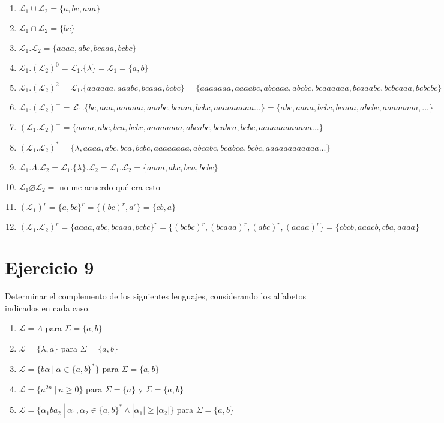 \documentclass{article}
\begin{document}
{{\begin{enumerate}[label=\alph*.,font=\itshape]
    \item {$\mathcal{L}_1 \cup \mathcal{L}_2 = \{a, bc, aaa\}$}
    \item {$\mathcal{L}_1 \cap \mathcal{L}_2 = \{bc\}$}
    \item {$\mathcal{L}_1.\mathcal{L}_2 = \{aaaa, abc, bcaaa, bcbc\}$}
    \item {$\mathcal{L}_1.(\mathcal{L}_2)^0= \mathcal{L}_1 . \{\lambda\} = \mathcal{L}_1 = \{a,b\}$}
    \item {$\mathcal{L}_1 . (\mathcal{L}_2)^2 = \mathcal{L}_1 . \{aaaaaa, aaabc, bcaaa, bcbc\} = \{aaaaaaa, aaaabc, abcaaa, abcbc, bcaaaaaa, bcaaabc, bcbcaaa, bcbcbc\}$}
    \item {$\mathcal{L}_1 . (\mathcal{L}_2)^+ = \mathcal{L}_1 . \{bc,aaa,aaaaaa,aaabc, bcaaa, bcbc, aaaaaaaaa...\}= \{abc, aaaa, bcbc, bcaaa, abcbc, aaaaaaaa, ...\}$}
    \item {$(\mathcal{L}_1.\mathcal{L}_2)^+ = \{aaaa, abc, bca, bcbc, aaaaaaaa, abcabc, bcabca, bcbc, aaaaaaaaaaaa...\}$}
    \item {$(\mathcal{L}_1.\mathcal{L}_2)^* = \{\lambda, aaaa, abc, bca, bcbc, aaaaaaaa, abcabc, bcabca, bcbc, aaaaaaaaaaaa...\}$}
    \item {$\mathcal{L}_1.\Lambda.\mathcal{L}_2 = \mathcal{L}_1.\{\lambda\}.\mathcal{L}_2 = \mathcal{L}_1.\mathcal{L}_2 = \{aaaa, abc, bca, bcbc\}$}
    \item {$\mathcal{L}_1 \varnothing \mathcal{L}_2 =$ no me acuerdo qué era esto}
    \item {$(\mathcal{L}_1)^r = \{a, bc\}^r = \{(bc)^r,a^r\}= \{cb,a\}$}
    \item {$(\mathcal{L}_1.\mathcal{L}_2)^r = \{aaaa, abc, bcaaa, bcbc\}^r = \{(bcbc)^r, (bcaaa)^r, (abc)^r, (aaaa)^r\}=\{cbcb, aaacb, cba, aaaa\}$}
\end{enumerate}

\section*{Ejercicio 9}{Determinar el complemento de los siguientes lenguajes, considerando los alfabetos indicados en cada caso.}
\begin{enumerate}[label=\alph*.,font=\itshape]
    \item {$\mathcal{L} = \Lambda$ para $\Sigma = \{a,b\}$}
    \item {$\mathcal{L} = \{\lambda,a\}$ para $\Sigma = \{a,b\}$}
    \item {$\mathcal{L} = \{b\alpha \ | \ \alpha \in \{a,b\}^*\}$ para $\Sigma = \{a,b\}$}
    \item {$\mathcal{L} = \{a^{2n} \ | \ n \geq 0\}$ para $\Sigma = \{a\}$ y $\Sigma = \{a,b\}$}
    \item {$ \mathcal{L} = \{\alpha_{1}ba_{2} \ | \ \alpha_{1},\alpha_{2} \in \{a,b\}^* \land |\alpha_{1}| \ge |\alpha_{2}|\}$ para $\Sigma = \{a,b\}$ \\ }
\end{enumerate}

}}
\end{document}
